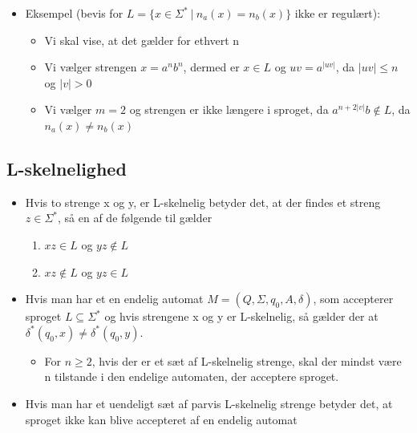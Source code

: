 \documentclass[a4, danish]{article}
\begin{document}
\begin{itemize}
\begin{itemize}
  \end{itemize}
  \item Eksempel (bevis for $L=\{ x \in \Sigma^* \ | \ n_a(x) = n_b(x) \}$ ikke er regulært):
  \begin{itemize}
	  \item Vi skal vise, at det gælder for ethvert n
    \item Vi vælger strengen $x=a^nb^n$, dermed er $x\in L$ og $uv=a^{|uv|}$, da $|uv| \leq n$ og $|v| > 0$
    \item Vi vælger $m=2$ og strengen er ikke længere i sproget, da $a^{n+2|v|}b \notin L$, da  $n_a(x) \neq n_b(x)$
  \end{itemize}

\end{itemize}


\subsection{L-skelnelighed}
  \begin{itemize}
    \item Hvis to strenge x og y, er L-skelnelig betyder det, at der findes et streng $z \in \Sigma^*$, så en af de følgende til gælder
     \begin{enumerate}
       \item $xz \in L$ og $yz \notin L$
       \item $xz \notin L$ og $yz \in L$
     \end{enumerate}
    \item Hvis man har et en endelig automat $M=(Q,\Sigma,q_0,A,\delta)$, som accepterer sproget $L\subseteq\Sigma^*$ og hvis strengene x og y er L-skelnelig, så gælder der at $\delta^*(q_0,x) \neq \delta^*(q_0,y) $. 
    \begin{itemize}
      \item For $n \geq 2$, hvis der er et sæt af L-skelnelig strenge, skal der mindst være n tilstande i den endelige automaten, der acceptere sproget.
    \end{itemize}
    \item Hvis man har et uendeligt sæt af parvis L-skelnelig strenge betyder det, at sproget ikke kan blive accepteret af en endelig automat 
  \end{itemize}
\end{document}

